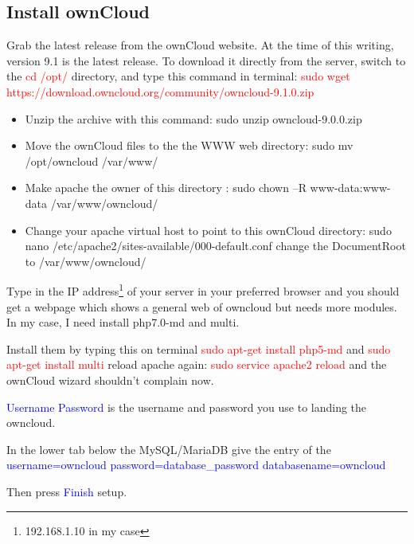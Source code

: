 \subsection{Install ownCloud}

Grab the latest release from the ownCloud website. At the time of this writing, version 9.1 is the latest release. To download it directly from the server, switch to the \textcolor{red}{cd /opt/} directory, and type this command in terminal: \textcolor{red}{sudo wget https://download.owncloud.org/community/owncloud-9.1.0.zip}

\begin{itemize}
        \item Unzip the archive with this command: sudo unzip owncloud-9.0.0.zip
        \item Move the ownCloud files to the the WWW web directory: sudo mv /opt/owncloud /var/www/
        \item Make apache the owner of this directory : sudo chown –R www-data:www-data /var/www/owncloud/
        \item Change your apache virtual host to point to this ownCloud directory:  sudo nano /etc/apache2/sites-available/000-default.conf change the DocumentRoot to /var/www/owncloud/
\end{itemize}


Type in the IP address\footnote{192.168.1.10 in my case} of your server in your preferred browser and you should get a webpage which shows a general web of owncloud but needs more modules. In my case, I need install php7.0-md and multi.



 Install them by typing this on terminal \textcolor{red}{sudo apt-get install php5-md} and \textcolor{red}{sudo apt-get install multi} reload apache again:  \textcolor{red}{sudo service apache2 reload} and the ownCloud wizard shouldn’t complain now.


\textcolor{blue}{Username Password} is the username and password you use to landing the owncloud. 

In the lower tab below the MySQL/MariaDB give the entry of the \textcolor{blue}{username=owncloud password=database\_password databasename=owncloud}

Then press \textcolor{blue}{Finish} setup.


